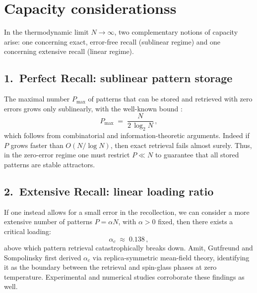 \documentclass[a4paper,12pt]{report}
\begin{document}
\section{Capacity considerationss}
In the thermodynamic limit \(N\to\infty\), two complementary notions of capacity arise:  
one concerning exact, error-free recall (sublinear regime) and one concerning extensive 
recall (linear regime).  

\subsection*{1.\ Perfect Recall: sublinear pattern storage}

The maximal number \(P_{\max}\) of patterns that can be stored and retrieved with zero 
errors grows only sublinearly, with the well-known bound \cite{Hertz2018}:
\begin{equation}
  P_{\max}\;=\;\frac{N}{2\,\log_2 N}\,,
\end{equation}
which follows from combinatorial and information-theoretic arguments.  
Indeed if \(P\) grows faster than \(O(N/\log N)\), then exact retrieval fails almost 
surely.  Thus, in the zero-error regime one must restrict \(P\ll N\) to guarantee that 
all stored patterns are stable attractors.

\subsection*{2.\ Extensive Recall: linear loading ratio}

If one instead allows for a small error in the recollection, we can consider a more 
extensive number of patterns \(P=\alpha N\), with \(\alpha>0\) fixed, then there exists 
a critical loading:  
\begin{equation}\label{eq:alpha_c}
  \alpha_c \;\approx\; 0.138 \, ,
\end{equation}
above which pattern retrieval catastrophically breaks down.  
Amit, Gutfreund and Sompolinsky \cite{PhysRevLett.55.1530, PhysRevA.35.2293, Amit1989} 
first derived \(\alpha_c\) via replica-symmetric mean-field theory, 
identifying it as the boundary between the retrieval and spin-glass phases at zero 
temperature.  
Experimental and numerical studies corroborate these findings as well.



\end{document}
